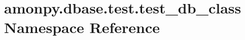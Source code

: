 \hypertarget{namespaceamonpy_1_1dbase_1_1test_1_1test__db__class}{\section{amonpy.\-dbase.\-test.\-test\-\_\-db\-\_\-class Namespace Reference}
\label{namespaceamonpy_1_1dbase_1_1test_1_1test__db__class}
}
